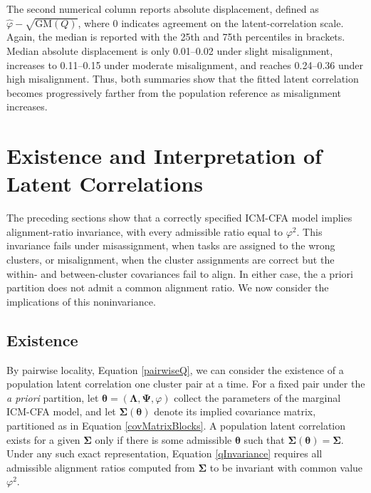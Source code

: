 \documentclass[
  american,
  man,floatsintext]{apa7}
\begin{document}
The second numerical column reports absolute displacement, defined as \(\widehat{\varphi}-\sqrt{\mathrm{GM}(Q)}\), where 0 indicates agreement on the latent-correlation scale. Again, the median is reported with the 25th and 75th percentiles in brackets. Median absolute displacement is only 0.01--0.02 under slight misalignment, increases to 0.11--0.15 under moderate misalignment, and reaches 0.24--0.36 under high misalignment. Thus, both summaries show that the fitted latent correlation becomes progressively farther from the population reference as misalignment increases.

\section{Existence and Interpretation of Latent Correlations}\label{existence-and-interpretation-of-latent-correlations}

The preceding sections show that a correctly specified ICM-CFA model implies alignment-ratio invariance, with every admissible ratio equal to \(\varphi^2\). This invariance fails under misassignment, when tasks are assigned to the wrong clusters, or misalignment, when the cluster assignments are correct but the within- and between-cluster covariances fail to align. In either case, the a priori partition does not admit a common alignment ratio. We now consider the implications of this noninvariance.

\subsection{Existence}\label{existence}

By pairwise locality, Equation \eqref{pairwiseQ}, we can consider the existence of a population latent correlation one cluster pair at a time. For a fixed pair under the \emph{a priori} partition, let \(\pmb\theta=(\pmb\Lambda,\pmb\Psi,\varphi)\) collect the parameters of the marginal ICM-CFA model, and let \(\pmb\Sigma(\pmb\theta)\) denote its implied covariance matrix, partitioned as in Equation \eqref{covMatrixBlocks}. A population latent correlation exists for a given \(\pmb\Sigma\) only if there is some admissible \(\pmb\theta\) such that \(\pmb\Sigma(\pmb\theta)=\pmb\Sigma\). Under any such exact representation, Equation \eqref{qInvariance} requires all admissible alignment ratios computed from \(\pmb\Sigma\) to be invariant with common value \(\varphi^2\).
\end{document}
